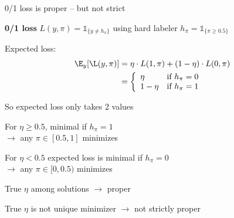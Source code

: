 \documentclass[11pt,compress,t,notes=noshow, xcolor=table]{beamer}
\begin{document}
\begin{framei}[sep=M]{0/1 loss is proper -- but not strict}

\item \textbf{0/1 loss} $L(y, \pi)=\mathds{1}_{\{y \neq h_\pi\}}$ using hard labeler  $h_{\pi}=\mathds{1}_{\{\pi\geq0.5\}}$ 
\item Expected loss:
\begin{align*}
\E_y[\L(y, \pi)] &= \eta \cdot L(1,\pi) + (1-\eta) \cdot L(0,\pi)\\
&= \left\{
\begin{array}{ll}
\eta & \text{if } h_{\pi} = 0 \\
1-\eta & \text{if } h_{\pi} = 1
\end{array}
\right.
\end{align*}

\item So expected loss only takes 2 values

\item For $\eta \geq 0.5$, minimal if $h_{\pi}=1$\\ $\rightarrow$ any $\pi \in [0.5,1]$ minimizes 

\item For $\eta < 0.5$ expected loss is minimal if $h_{\pi}=0$\\ $\rightarrow$ any $\pi \in [0, 0.5)$ minimizes 

\item True $\eta$ among solutions $\rightarrow$ proper
\item True $\eta$ is not unique minimizer $\rightarrow$ not strictly proper


\end{framei}
\end{document}
